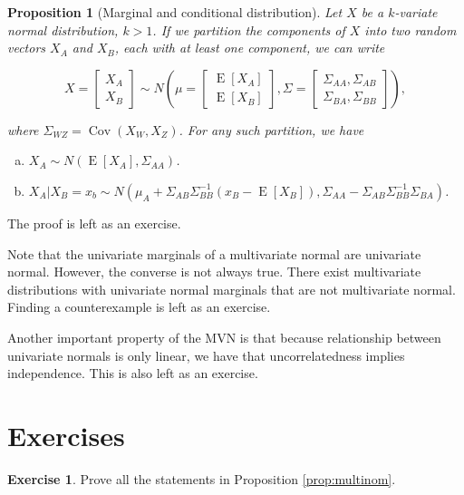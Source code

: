 \documentclass{book}
\theoremstyle{plain}%
\newtheorem{proposition}{Proposition}[section]
\theoremstyle{definition}
\newtheorem{exercise}{Exercise}[chapter]
\DeclareMathOperator{\Cov}{Cov}
\DeclareMathOperator{\E}{E}
\begin{document}
\begin{proposition}[Marginal and conditional distribution]
Let $X$ be a $k$-variate normal distribution, $k > 1$. If we partition the components of $X$ into two random vectors $X_A$ and $X_B$, each with at least one component, we can write

$$X = \begin{bmatrix}
           X_{A} \\
           X_{B}
         \end{bmatrix}\sim N\left( \mu =  \begin{bmatrix}
           \E[X_A] \\
           \E[X_B]
         \end{bmatrix}, \Sigma = \begin{bmatrix}
           \Sigma_{AA}, \Sigma_{AB} \\
           \Sigma_{BA}, \Sigma_{BB}
         \end{bmatrix}  \right),$$
         
where $\Sigma_{WZ} = \Cov(X_W, X_Z)$. For any such partition, we have

\begin{enumerate}[(a)]
\item $X_A \sim N(\E[X_A], \Sigma_{AA})$.
\item $X_A | X_B = x_b \sim N(\mu_A + \Sigma_{AB}\Sigma_{BB}^{-1}(x_B - \E[X_B]), \Sigma_{AA} - \Sigma_{AB}\Sigma_{BB}^{-1}\Sigma_{BA})$.

\end{enumerate}\label{prop:marginal}

\end{proposition}

The proof is left as an exercise.

Note that the univariate marginals of a multivariate normal are univariate normal. However, the converse is not always true. There exist multivariate distributions with univariate normal marginals that are not multivariate normal. Finding a counterexample is left as an exercise.

Another important property of the MVN is that because relationship between univariate normals is only linear, we have that uncorrelatedness implies independence. This is also left as an exercise.


\section*{Exercises}

\begin{exercise}
Prove all the statements in Proposition \ref{prop:multinom}.
\end{exercise}
\end{document}
